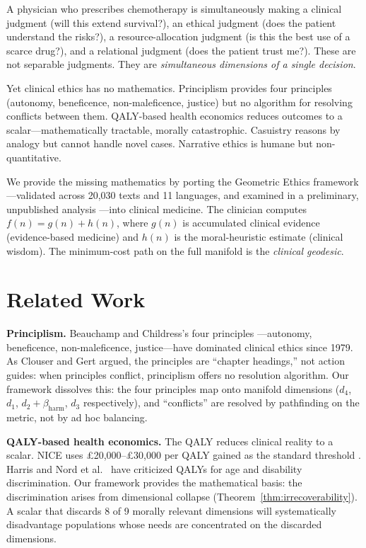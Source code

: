 \documentclass[12pt]{article}
\theoremstyle{definition}
\theoremstyle{remark}
\begin{document}
A physician who prescribes chemotherapy is simultaneously making a clinical judgment (will this extend survival?), an ethical judgment (does the patient understand the risks?), a resource-allocation judgment (is this the best use of a scarce drug?), and a relational judgment (does the patient trust me?).  These are not separable judgments.  They are \emph{simultaneous dimensions of a single decision}.

Yet clinical ethics has no mathematics.  Principlism \cite{beauchamp2019} provides four principles (autonomy, beneficence, non-maleficence, justice) but no algorithm for resolving conflicts between them.  QALY-based health economics \cite{weinstein1977,drummond2015} reduces outcomes to a scalar---mathematically tractable, morally catastrophic.  Casuistry \cite{jonsen1988} reasons by analogy but cannot handle novel cases.  Narrative ethics \cite{charon2006} is humane but non-quantitative.

We provide the missing mathematics by porting the Geometric Ethics framework \cite{bond2026geometric}---validated across 20,030 texts and 11 languages, and examined in a preliminary, unpublished analysis \cite{thiele2026}---into clinical medicine.  The clinician computes $f(n) = g(n) + h(n)$, where $g(n)$ is accumulated clinical evidence (evidence-based medicine) and $h(n)$ is the moral-heuristic estimate (clinical wisdom).  The minimum-cost path on the full manifold is the \emph{clinical geodesic}.


\section{Related Work}
\label{sec:related}

\textbf{Principlism.}  Beauchamp and Childress's four principles \cite{beauchamp2019}---autonomy, beneficence, non-maleficence, justice---have dominated clinical ethics since 1979.  As Clouser and Gert \cite{clouser1990} argued, the principles are ``chapter headings,'' not action guides: when principles conflict, principlism offers no resolution algorithm.  Our framework dissolves this: the four principles map onto manifold dimensions ($d_4$, $d_1$, $d_2 + \beta_{\text{harm}}$, $d_3$ respectively), and ``conflicts'' are resolved by pathfinding on the metric, not by ad hoc balancing.

\textbf{QALY-based health economics.}  The QALY \cite{weinstein1977,drummond2015} reduces clinical reality to a scalar.  NICE uses \pounds20,000--\pounds30,000 per QALY gained as the standard threshold \cite{nice2013}.  Harris \cite{harris1987} and Nord et al.\ \cite{nord1999} have criticized QALYs for age and disability discrimination.  Our framework provides the mathematical basis: the discrimination arises from dimensional collapse (Theorem~\ref{thm:irrecoverability}).  A scalar that discards 8 of 9 morally relevant dimensions will systematically disadvantage populations whose needs are concentrated on the discarded dimensions.
\end{document}
